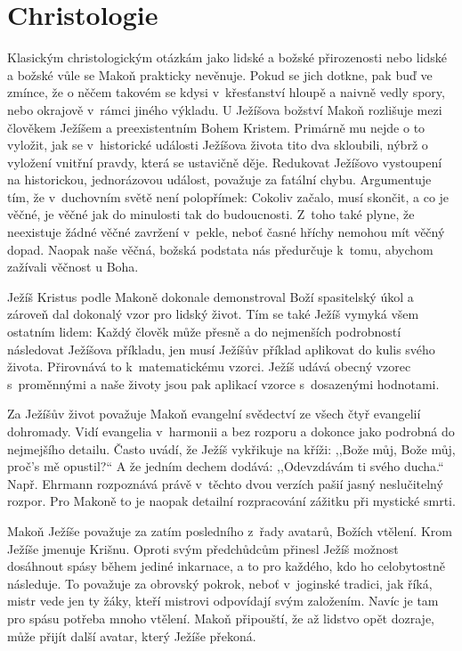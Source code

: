 \section{Christologie}

Klasickým christologickým otázkám jako lidské a božské přirozenosti nebo lidské
a božské vůle se Makoň prakticky nevěnuje. Pokud se jich dotkne, pak buď ve
zmínce, že o něčem takovém se kdysi v~křesťanství hloupě a naivně vedly spory,
nebo okrajově v~rámci jiného výkladu. U Ježíšova božství Makoň rozlišuje mezi
člověkem Ježíšem a preexistentním Bohem Kristem. Primárně mu nejde o to
vyložit, jak se v~historické události Ježíšova života tito dva skloubili, nýbrž
o vyložení vnitřní pravdy, která se ustavičně děje. Redukovat Ježíšovo
vystoupení na historickou, jednorázovou událost, považuje za fatální chybu.
Argumentuje tím, že v~duchovním světě není polopřímek: Cokoliv začalo, musí
skončit, a co je věčné, je věčné jak do minulosti tak do
budoucnosti. Z~toho
také plyne, že neexistuje žádné věčné zavržení v~pekle, neboť časné hříchy
nemohou mít věčný dopad. Naopak naše věčná, božská podstata nás předurčuje
k~tomu, abychom zažívali věčnost u Boha.

Ježíš Kristus podle Makoně dokonale demonstroval Boží spasitelský úkol a zároveň
dal dokonalý vzor pro lidský život. Tím se také Ježíš vymyká všem ostatním
lidem: Každý člověk může přesně a do nejmenších podrobností následovat Ježíšova
příkladu, jen musí Ježíšův příklad aplikovat do kulis svého života. Přirovnává
to k~matematickému vzorci. Ježíš udává obecný vzorec s~proměnnými a naše životy
jsou pak aplikací vzorce s~dosazenými hodnotami.

Za Ježíšův život považuje Makoň evangelní svědectví ze všech čtyř evangelií
dohromady. Vidí evangelia v~harmonii a bez rozporu a dokonce jako podrobná do
nejmejšího detailu. Často uvádí, že Ježíš
vykřikuje na kříži: ,,Bože můj, Bože můj, proč's mě opustil?{}`` A že jedním
dechem dodává: ,,Odevzdávám ti svého ducha.`` Např. Ehrmann rozpoznává právě
v~těchto dvou verzích pašií jasný neslučitelný rozpor\cite{ehrman2000new}. Pro
Makoně to je naopak detailní rozpracování zážitku při mystické smrti.

Makoň Ježíše považuje za zatím posledního z~řady avatarů, Božích
vtělení. Krom
Ježíše jmenuje Krišnu. Oproti svým předchůdcům přinesl Ježíš možnost dosáhnout spásy
během jediné inkarnace, a to pro každého, kdo ho celobytostně následuje. To
považuje za obrovský pokrok, neboť v~joginské tradici, jak říká, mistr vede jen
ty žáky, kteří mistrovi odpovídají svým založením. Navíc je tam pro spásu
potřeba mnoho vtělení. Makoň připouští, že až lidstvo opět dozraje, může přijít
další avatar, který Ježíše překoná.%

